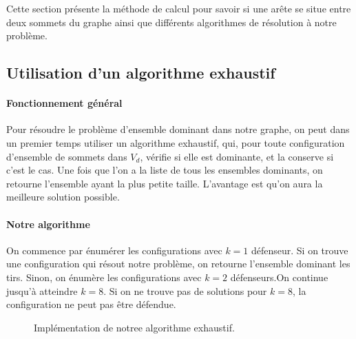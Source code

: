 \documentclass[12pt]{article}
\begin{document}
Cette section présente la méthode de calcul pour savoir si une arête se situe entre deux sommets du graphe ainsi que différents algorithmes de résolution à notre problème.


\subsection{Utilisation d'un algorithme exhaustif}

\paragraph{Fonctionnement général}
Pour résoudre le problème d'ensemble dominant dans notre graphe, on peut dans un premier temps utiliser un algorithme exhaustif, qui, pour toute configuration d'ensemble de sommets dans $V_d$, vérifie si elle est dominante, et la conserve si c'est le cas. Une fois que l'on a la liste de tous les ensembles dominants, on retourne l'ensemble ayant la plus petite taille. L'avantage est qu'on aura la meilleure solution possible.

\paragraph{Notre algorithme}
On commence par énumérer les configurations avec $k=1$ défenseur. Si on trouve une configuration qui résout notre problème, on retourne l'ensemble dominant les tirs. Sinon, on énumère  les configurations avec $k=2$ défenseurs.On continue jusqu'à atteindre $k=8$. Si on ne trouve pas de solutions pour $k = 8$, la configuration ne peut pas être défendue.

\begin{figure}[h!]
  \begin{algorithm}[H]
    \BlankLine
  \end{algorithm}
  \caption{Implémentation de notree algorithme exhaustif.}
\end{figure}
\end{document}
